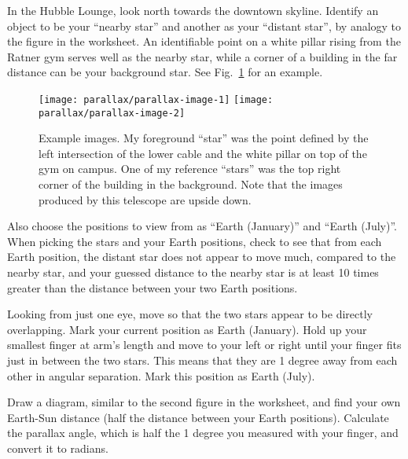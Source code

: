 \begin{steps}
	\item In the Hubble Lounge, look north towards the downtown skyline. Identify an object to be your ``nearby star'' and another as your ``distant star'', by analogy to the figure in the worksheet. An identifiable point on a white pillar rising from the Ratner gym serves well as the nearby star, while a corner of a building in the far distance can be your background star. See Fig.~\ref{par:fig:images} for an example.
\end{steps}

\begin{figure}
	\texttt{[image: parallax/parallax-image-1]}
	\texttt{[image: parallax/parallax-image-2]}
	\caption{Example images. My foreground ``star'' was the point defined by the left intersection of the lower cable and the white pillar on top of the gym on campus. One of my reference ``stars'' was the top right corner of the building in the background. Note that the images produced by this telescope are upside down.}\label{par:fig:images}
\end{figure}

\begin{steps}
	\item Also choose the positions to view from as ``Earth (January)'' and ``Earth (July)''. When picking the stars and your Earth positions, check to see that from each Earth position, the distant star does not appear to move much, compared to the nearby star, and your guessed distance to the nearby star is at least 10 times greater than the distance between your two Earth positions.

	\item Looking from just one eye, move so that the two stars appear to be directly overlapping. Mark your current position as Earth (January). Hold up your smallest finger at arm's length and move to your left or right until your finger fits just in between the two stars. This means that they are 1 degree away from each other in angular separation. Mark this position as Earth (July).
	
	\item Draw a diagram, similar to the second figure in the worksheet, and find your own Earth-Sun distance (half the distance between your Earth positions). Calculate the parallax angle, which is half the 1 degree you measured with your finger, and convert it to radians.
\end{steps}
	
